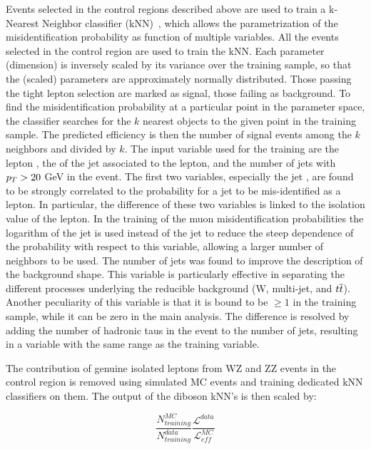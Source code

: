 Events selected in the control regions described above are used to train a k-Nearest Neighbor classifier (kNN)~\cite{TMVA}, which allows the parametrization of the misidentification probability as function of multiple variables. All the events selected in the control region are used to train the kNN.
Each parameter (dimension) is inversely scaled by its variance over the training sample, so that the (scaled) parameters are approximately normally distributed.
Those passing the tight lepton selection are marked as signal, those failing as background.
To find the misidentification probability at a particular point in the parameter space, the classifier searches for the $k$ nearest objects to the given point in the training sample.
The predicted efficiency is then the number of signal events among the $k$ neighbors and divided by $k$.
The input variable used for the training are the lepton \pT, the \pT of the jet associated to the lepton, and the number of jets with $p_{T} > 20$ GeV in the event. 
The first two variables, especially the jet \pT, are found to be strongly correlated to the probability for a jet to be mis-identified as a lepton. In particular, the difference of these two variables is linked to the isolation value of the lepton. In the training of the muon misidentification probabilities the logarithm of the jet \pT is used instead of the jet \pT to reduce the steep dependence of the probability with respect to this variable, allowing a larger number of neighbors to be used.
The number of jets was found to improve the description of the background shape. This variable is particularly effective in separating the different processes underlying the reducible background (W, multi-jet, and $t\overline{t}$). Another peculiarity of this variable is that it is bound to be $\geq 1$ in the training sample, while it can be zero in the main analysis. The difference is resolved by adding the number of hadronic taus in the event to the number of jets, resulting in a variable with the same range as the training variable.

The contribution of genuine isolated leptons from WZ and ZZ events in the control region is removed using simulated MC events and training dedicated kNN classifiers on them.
The output of the diboson kNN's is then scaled by:

\begin{equation}
\frac{N_{training}^{MC}}{N_{training}^{data}}\frac{\mathcal{L}^{data}}{\mathcal{L}_{eff}^{MC}}
\end{equation}

